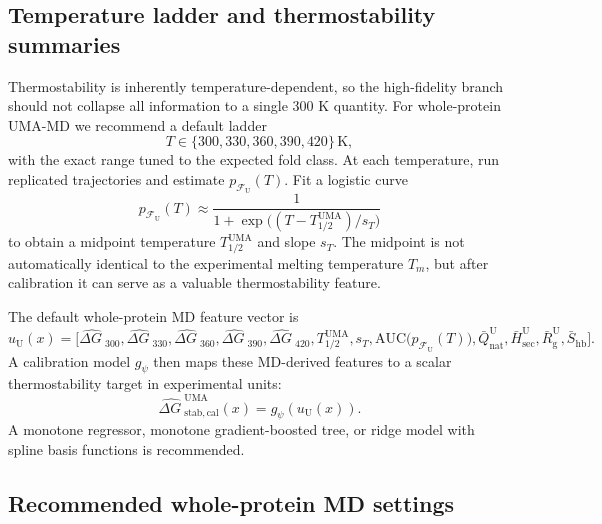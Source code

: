 \documentclass[11pt]{article}
\newcommand{\dG}{\ensuremath{\Delta G \ }}
\begin{document}
\subsection{Temperature ladder and thermostability summaries}

Thermostability is inherently temperature-dependent, so the high-fidelity branch should not collapse all information to a single $300$ K quantity. For whole-protein UMA-MD we recommend a default ladder
\[
T\in\{300,330,360,390,420\}\,\mathrm K,
\]
with the exact range tuned to the expected fold class. At each temperature, run replicated trajectories and estimate $p_{\mathcal F_{\mathrm U}}(T)$. Fit a logistic curve
\begin{equation}
    p_{\mathcal F_{\mathrm U}}(T)\approx \frac{1}{1+\exp\big((T-T_{1/2}^{\mathrm{UMA}})/s_T\big)}
\end{equation}
to obtain a midpoint temperature $T_{1/2}^{\mathrm{UMA}}$ and slope $s_T$. The midpoint is not automatically identical to the experimental melting temperature $T_m$, but after calibration it can serve as a valuable thermostability feature.

The default whole-protein MD feature vector is
\begin{equation}
\label{eq:umafeatures}
    u_{\mathrm U}(x)=\Big[\widehat{\dG}_{300},\widehat{\dG}_{330},\widehat{\dG}_{360},\widehat{\dG}_{390},\widehat{\dG}_{420},T_{1/2}^{\mathrm{UMA}},s_T,\mathrm{AUC}\big(p_{\mathcal F_{\mathrm U}}(T)\big),\bar Q_{\mathrm{nat}}^{\mathrm U},\bar H_{\mathrm{sec}}^{\mathrm U},\bar R_{\mathrm g}^{\mathrm U},\bar S_{\mathrm{hb}}\Big].
\end{equation}
A calibration model $g_\psi$ then maps these MD-derived features to a scalar thermostability target in experimental units:
\begin{equation}
    \widehat{\dG}^{\mathrm{UMA}}_{\mathrm{stab,cal}}(x)=g_\psi\!\left(u_{\mathrm U}(x)\right).
\end{equation}
A monotone regressor, monotone gradient-boosted tree, or ridge model with spline basis functions is recommended.

\subsection{Recommended whole-protein MD settings}
\end{document}
